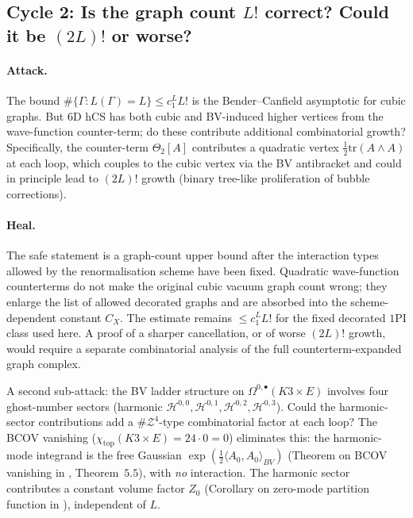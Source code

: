 \documentclass[11pt]{article}
\theoremstyle{definition}\newtheorem{definition}[theorem]{Definition}
\theoremstyle{remark}\newtheorem{remark}[theorem]{Remark}\newtheorem{example}[theorem]{Example}
\begin{document}
\subsection{Cycle 2: Is the graph count $L!$ correct? Could it be $(2L)!$ or worse?}

\paragraph{Attack.}
The bound $\#\{\Gamma : L(\Gamma) = L\}\leq c_1^L L!$ is the
Bender--Canfield asymptotic for cubic graphs. But $6$D hCS has both
cubic and BV-induced higher vertices from the wave-function counter-term;
do these contribute additional combinatorial growth? Specifically, the
counter-term $\Theta_2[A]$ contributes a quadratic vertex
$\tfrac12\mathrm{tr}(A\wedge A)$ at each loop, which couples to the
cubic vertex via the BV antibracket and could in principle lead to
$(2L)!$ growth (binary tree-like proliferation of bubble corrections).

\paragraph{Heal.}
The safe statement is a graph-count upper bound after the interaction
types allowed by the renormalisation scheme have been fixed. Quadratic
wave-function counterterms do not make the original cubic vacuum graph
count wrong; they enlarge the list of allowed decorated graphs and are
absorbed into the scheme-dependent constant $C_X$. The estimate remains
$\leq c_1^L L!$ for the fixed decorated $1$PI class used here. A proof
of a sharper cancellation, or of worse $(2L)!$ growth, would require a
separate combinatorial analysis of the full counterterm-expanded graph
complex.

A second sub-attack: the BV ladder structure on $\Omega^{0,\bullet}(K3\times E)$
involves four ghost-number sectors (harmonic $\mathcal H^{0,0}, \mathcal H^{0,1},
\mathcal H^{0,2}, \mathcal H^{0,3}$). Could the harmonic-sector
contributions add a $\#\mathcal Z^4$-type combinatorial factor at each
loop? The BCOV vanishing
($\chi_{\mathrm{top}}(K3\times E) = 24\cdot 0 = 0$) eliminates this:
the harmonic-mode integrand is the free Gaussian
$\exp(\tfrac12\langle A_0,A_0\rangle_{BV})$ (Theorem on BCOV
vanishing in \cite{cy_to_chiral}, Theorem~$5.5$), with
\emph{no} interaction. The harmonic sector contributes a constant
volume factor $Z_0$ (Corollary on zero-mode partition function in
\cite{cy_to_chiral}), independent of $L$.
\end{document}
